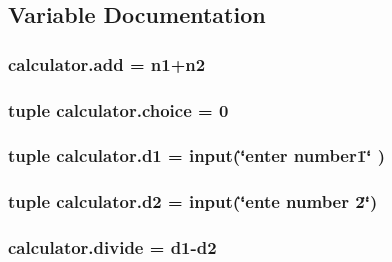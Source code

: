 \subsection{Variable Documentation}
\hypertarget{namespacecalculator_a6944e5725a7014f1bd6ef08281cb2076}{
\subsubsection[{add}]{\setlength{\rightskip}{0pt plus 5cm}calculator.\-add = {\bf n1}+{\bf n2}}}\label{namespacecalculator_a6944e5725a7014f1bd6ef08281cb2076}
\hypertarget{namespacecalculator_a515623328688b8f1e3d0632aaa4d1d84}{
\subsubsection[{choice}]{\setlength{\rightskip}{0pt plus 5cm}tuple calculator.\-choice = 0}}\label{namespacecalculator_a515623328688b8f1e3d0632aaa4d1d84}
\hypertarget{namespacecalculator_aa8b336bc530cecfedd8ade1e5e81c52a}{
\subsubsection[{d1}]{\setlength{\rightskip}{0pt plus 5cm}tuple calculator.\-d1 = input(\char`\"{}enter number1\char`\"{} )}}\label{namespacecalculator_aa8b336bc530cecfedd8ade1e5e81c52a}
\hypertarget{namespacecalculator_aadeba3e174f4ef054df2b4649e547062}{
\subsubsection[{d2}]{\setlength{\rightskip}{0pt plus 5cm}tuple calculator.\-d2 = input(\char`\"{}ente number 2\char`\"{})}}\label{namespacecalculator_aadeba3e174f4ef054df2b4649e547062}
\hypertarget{namespacecalculator_ab0657f7331541886d291e42dc98edb56}{
\subsubsection[{divide}]{\setlength{\rightskip}{0pt plus 5cm}calculator.\-divide = {\bf d1}-\/{\bf d2}}}\label{namespacecalculator_ab0657f7331541886d291e42dc98edb56}

